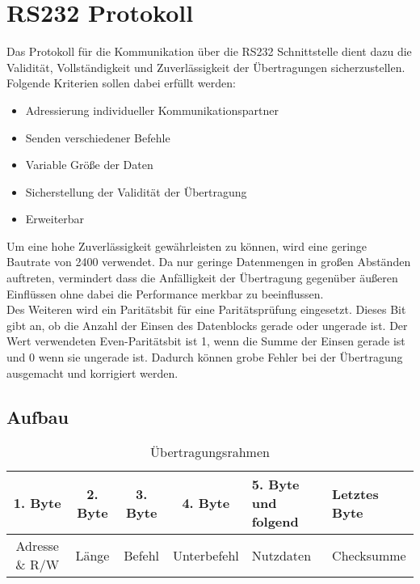 \section{RS232 Protokoll}
\label{section_RS232_Protokoll}
Das Protokoll für die Kommunikation über die RS232 Schnittstelle dient dazu die Validität, Vollständigkeit und Zuverlässigkeit der Übertragungen sicherzustellen.\\

Folgende Kriterien sollen dabei erfüllt werden:
\begin{itemize}
\item Adressierung individueller Kommunikationspartner
\item Senden verschiedener Befehle
\item Variable Größe der Daten
\item Sicherstellung der Validität der Übertragung
\item Erweiterbar
\end{itemize}



Um eine hohe Zuverlässigkeit gewährleisten zu können, wird eine geringe Bautrate von 2400 verwendet. Da nur geringe Datenmengen in großen Abständen auftreten, vermindert dass die Anfälligkeit der Übertragung gegenüber äußeren Einflüssen ohne dabei die Performance merkbar zu beeinflussen.\\
Des Weiteren wird ein Paritätsbit für eine Paritätsprüfung eingesetzt. Dieses Bit gibt an, ob die Anzahl der Einsen des Datenblocks gerade oder ungerade ist. Der Wert verwendeten Even-Paritätsbit ist 1, wenn die Summe der Einsen gerade ist und 0 wenn sie ungerade ist. Dadurch können grobe Fehler bei der Übertragung ausgemacht und korrigiert werden.

\subsection{Aufbau}
\begin{table}[H]
\begin{center}
\begin{tabularx}{\textwidth}{|c|c|c|c|X|X|}\hline
 1. Byte & 2. Byte & 3. Byte & 4. Byte & 5. Byte und folgend & Letztes Byte\\ \hline
  Adresse \& R/W & Länge & Befehl & Unterbefehl & Nutzdaten & Checksumme\\ \hline
\end{tabularx}
\caption{Übertragungsrahmen}
\label{table_Frame}
\end{center}
\end{table}


